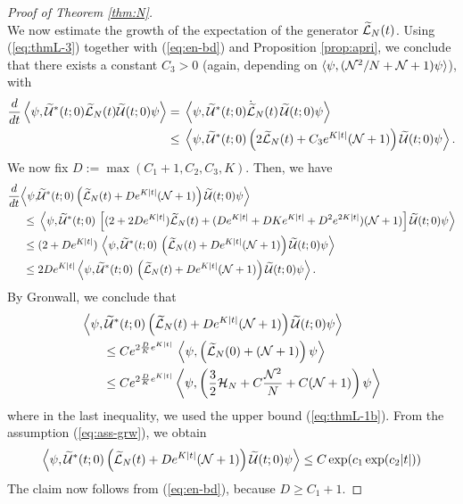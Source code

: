 \documentclass[11pt,a4paper]{article}
\newcommand{\done}{}
\newcommand{\ech}[2]{#2}	%
\newcommand{\cU}{{\cal U}}
\newcommand{\wt}{\widetilde}
\newcommand{\cH}{{\cal H}}
\newcommand{\cL}{{\cal L}}
\newcommand{\cN}{{\cal N}}
\begin{document}
\begin{proof}[Proof of Theorem \ref{thm:N}]
\[ \]
We now estimate the growth of the expectation\done{} of the generator $\wt{\cL}_N (t)$. Using (\ref{eq:thmL-3}) together with (\ref{eq:en-bd}) and Proposition \ref{prop:apri}, we conclude that there exists a constant $C_3 >0$ (again, depending on $\langle \psi , (\cN^2/ N + \cN + 1) \psi \rangle$\ech{ and on the constant $C$ in (\ref{eq:varphi-bds})}{}), with 
\[ \begin{split}
\frac{d}{dt} \left\langle \psi, \wt{\cU}^* (t;0) \wt{\cL}_N (t) \wt{\cU} (t;0) \psi \right\rangle = \; & \left\langle \psi, \wt{\cU}^* (t;0) \dot{\wt{\cL}}_N (t) \, \wt{\cU} (t;0) \psi \right\rangle \\ \leq \; & \left\langle \psi , \wt{\cU}^* (t;0) \left( 2 \wt{\cL}_N (t) + C_3 e^{K|t|} (\cN + 1) \right) \wt{\cU} (t;0) \psi \right\rangle. 
\end{split} \]
We now fix $D := \max (C_1 + 1, C_2 , C_3 , K)$. Then, we have
\[ \begin{split} 
\frac{d}{dt} \Big\langle \psi , &\wt{\cU}^* (t;0) \left( \wt{\cL}_N (t) + D e^{K \lvert t\rvert} (\cN + 1) \right) \wt{\cU} (t;0) \psi \Big\rangle \\  \leq \; & \left\langle \psi, \wt{\cU}^* (t;0) \, \left[ (2 + 2D e^{K|t|}) \wt{\cL}_N (t) + (D e^{K |t|} +D K e^{K |t|} + D^2 e^{2K |t|}) (\cN + 1) \right] \wt{\cU} (t;0) \psi \right\rangle\\  \leq \; &(2 + D e^{K|t|}) \, \left\langle \psi, \wt{\cU}^* (t;0) \, \left( \wt{\cL}_N (t) + D e^{K|t|} (\cN + 1) \right) \wt{\cU} (t;0) \psi \right \rangle \\ \leq \; & 2D e^{K |t|} \left\langle \psi, \wt{\cU}^* (t;0) \, \left( \wt{\cL}_N (t) + D e^{K|t|} (\cN + 1) \right) \wt{\cU} (t;0) \psi \right\rangle. \end{split} \]
By Gronwall, we conclude that
\[ \begin{split}  \Big\langle \psi , \wt{\cU}^* &(t;0) \left( \wt{\cL}_N (t) + 
D e^{K \lvert t\rvert} (\cN + 1) \right) \wt{\cU} (t;0) \psi \Big\rangle \\ \leq \; & C e^{2 \frac{D}{K} e^{K |t|}} \, \left\langle \psi , \left( \wt{\cL}_N (0) + (\cN + 1)\right) \psi \right\rangle \\ \leq \; &  C e^{2 \frac{D}{K} e^{K |t|}} \left\langle \psi , \left( \frac{3}{2} \cH_N+ C \frac{\cN^2}{N} + C (\cN+ 1) \right) \psi \right\rangle \end{split} \]
where in the last inequality, we used the upper bound (\ref{eq:thmL-1b}). {F}rom the assumption (\ref{eq:ass-grw}), we obtain 
\[  \Big\langle \psi , \wt{\cU}^* (t;0) \left( \wt{\cL}_N (t) + 
D e^{K \lvert t\rvert} (\cN + 1) \right) \wt{\cU} (t;0) \psi \Big\rangle  \leq C \exp (c_1 \exp (c_2 |t|)) \]
The claim now follows from (\ref{eq:en-bd}), because $D \geq C_1 +1$.
\end{proof}
\end{document}
